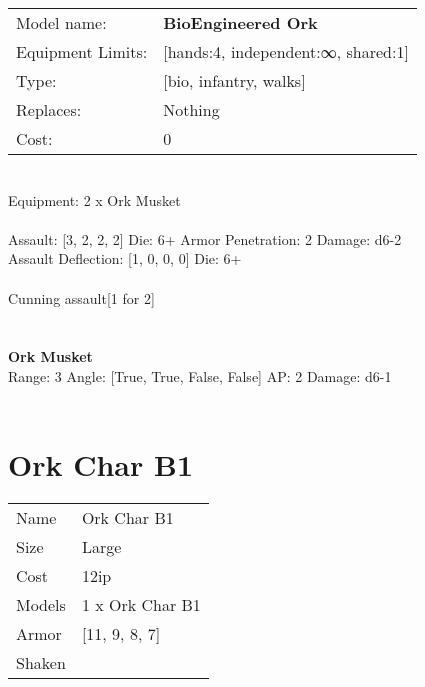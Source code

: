 \noindent
\begin{tabular}{ll}
Model name: &{\bf BioEngineered Ork } \\
Equipment Limits: &[hands:4, independent:∞, shared:1] \\
Type: &[bio, infantry, walks] \\
Replaces: &Nothing \\
Cost: & 0\\
\end{tabular}
\ \\
Equipment: 2 x Ork Musket \\
\ \\
Assault: [3, 2, 2, 2] Die: 6+ Armor Penetration: 2 Damage: d6-2 \\
Assault Deflection: [1, 0, 0, 0] Die: 6+\\
\\ 
Cunning assault[1 for 2]\\ 
 
\ \\

\ \\
{\bf Ork Musket } \\



Range: 3  Angle: [True, True, False, False] AP: 2 Damage: d6-1 \\




 
\ \\













\clearpage

\section{ Ork Char B1 }

\begin{tabular}{ll}
  Name & Ork Char B1 \\
  Size & Large\\
  Cost & 12ip\\
  Models & 1 x Ork Char B1\\
  Armor & [11, 9, 8, 7]\\
  Shaken & \\
\end{tabular}

